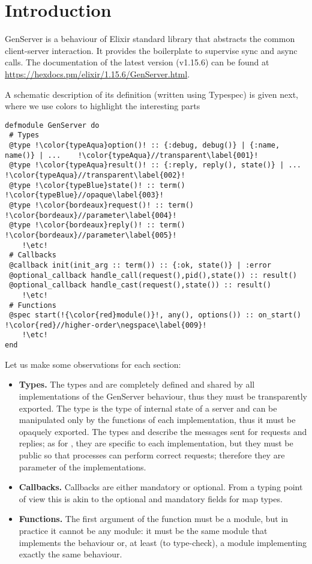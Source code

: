 \documentclass[a4paper,10pt]{article}
\author{Aghilas Y. Boussaa and Giuseppe Castagna}
\begin{document}
\section{Introduction}

GenServer is a behaviour of Elixir standard library that abstracts the
common client-server interaction. It provides the boilerplate to
supervise sync and async calls. The documentation of the latest
version (v1.15.6) can be found at \url{https://hexdocs.pm/elixir/1.15.6/GenServer.html}.

A schematic description of its definition (written using Typespec)
is given next, where we use colors to highlight the
interesting parts
\begin{verbatim}
defmodule GenServer do
 # Types  
 @type !\color{typeAqua}option()! :: {:debug, debug()} | {:name, name()} | ...    !\color{typeAqua}//transparent\label{001}!
 @type !\color{typeAqua}result()! :: {:reply, reply(), state()} | ...             !\color{typeAqua}//transparent\label{002}!
 @type !\color{typeBlue}state()! :: term()                                        !\color{typeBlue}//opaque\label{003}!
 @type !\color{bordeaux}request()! :: term()                                      !\color{bordeaux}//parameter\label{004}!
 @type !\color{bordeaux}reply()! :: term()                                        !\color{bordeaux}//parameter\label{005}!
    !\etc!
 # Callbacks
 @callback init(init_arg :: term()) :: {:ok, state()} | :error 
 @optional_callback handle_call(request(),pid(),state()) :: result() 
 @optional_callback handle_cast(request(),state()) :: result()       
    !\etc!
 # Functions
 @spec start(!{\color{red}module()}!, any(), options()) :: on_start()          !\color{red}//higher-order\negspace\label{009}!
    !\etc!
end
\end{verbatim}
Let us make some observations for each section:
\begin{itemize}
  \item \textbf{Types.} The types  and  are completely defined and  shared by all implementations of the GenServer behaviour, thus they must be transparently exported. The type  is the type of internal state of a server and can be manipulated only by the functions of each implementation, thus it must be opaquely exported. The types  and  describe the messages sent for requests and replies; as for , they are specific to each implementation, but they must be public so that processes can perform correct requests; therefore they are parameter of the implementations.

  \item \textbf{Callbacks.} Callbacks are either mandatory or optional. From a typing point of view this is akin to the optional and mandatory fields for map types.

  \item \textbf{Functions.} The first argument of the  function must be a module, but in practice it cannot be any module: it must be the same module that implements the behaviour or, at least (to type-check), a module implementing exactly the same behaviour.
\end{itemize}
\end{document}
